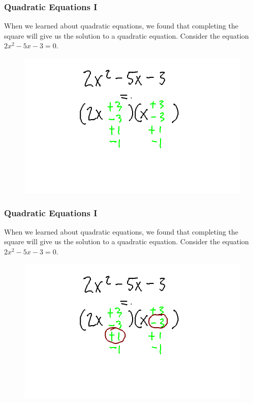 \documentclass[xcolor=dvipsnames]{beamer}
\begin{document}
\begin{frame}
  \frametitle{Quadratic Equations I}
  When we learned about quadratic equations, we found that completing
  the square will give us the solution to a quadratic equation.
  Consider the equation $2x^{2}-5x-3=0$.
  \begin{figure}[h]
    \includegraphics[scale=.4]{./qfac2.png}
  \end{figure}
\end{frame}

\begin{frame}
  \frametitle{Quadratic Equations I}
  When we learned about quadratic equations, we found that completing
  the square will give us the solution to a quadratic equation.
  Consider the equation $2x^{2}-5x-3=0$.
  \begin{figure}[h]
    \includegraphics[scale=.4]{./qfac3.png}
  \end{figure}
\end{frame}
\end{document}
